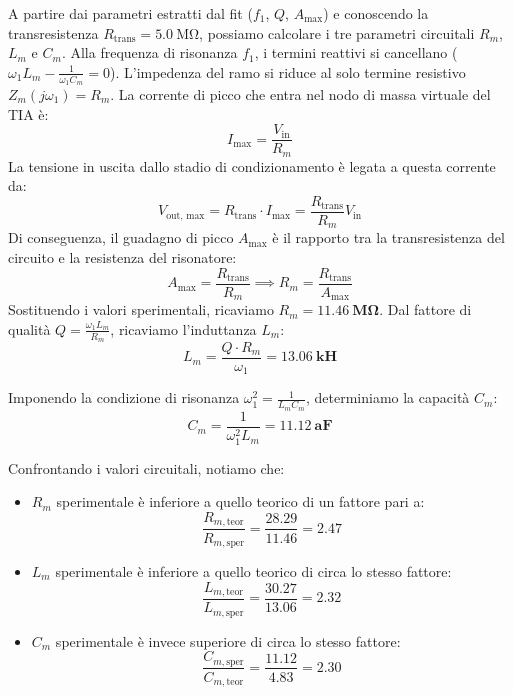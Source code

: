 \documentclass[11pt,a4paper]{article}
\begin{document}
\noindent A partire dai parametri estratti dal fit ($f_1$, $Q$, $A_{\text{max}}$) e conoscendo la transresistenza $R_{\text{trans}} = \SI{5.0}{\mega\ohm}$, possiamo calcolare i tre parametri circuitali $R_m$, $L_m$ e $C_m$. Alla frequenza di risonanza $f_1$, i termini reattivi si cancellano ($\omega_1 L_m - \frac{1}{\omega_1 C_m} = 0$). L'impedenza del ramo si riduce al solo termine resistivo $Z_m(j\omega_1) = R_m$. La corrente di picco che entra nel nodo di massa virtuale del TIA è:
\begin{equation}
    I_{\text{max}} = \frac{V_{\text{in}}}{R_m}
\end{equation}
La tensione in uscita dallo stadio di condizionamento è legata a questa corrente da:
\begin{equation}
    V_{\text{out, max}} = R_{\text{trans}} \cdot I_{\text{max}} = \frac{R_{\text{trans}}}{R_m} V_{\text{in}}
\end{equation}
Di conseguenza, il guadagno di picco $A_{\text{max}}$ è il rapporto tra la transresistenza del circuito e la resistenza del risonatore:
\begin{equation}
    A_{\text{max}} = \frac{R_{\text{trans}}}{R_m} \implies R_m = \frac{R_{\text{trans}}}{A_{\text{max}}}
\end{equation}
Sostituendo i valori sperimentali, ricaviamo $R_m  = \mathbf{\SI{11.46}{\mega\ohm}}$. Dal fattore di qualità $Q = \frac{\omega_1 L_m}{R_m}$, ricaviamo l'induttanza $L_m$:
\begin{equation}
    \label{eq:lm_sperimentale}
    L_m = \frac{Q \cdot R_m}{\omega_1}  = \mathbf{\SI{13.06}{\kilo\henry}}
\end{equation}

\noindent Imponendo la condizione di risonanza $\omega_1^2 = \frac{1}{L_m C_m}$, determiniamo la capacità  $C_m$:
\begin{equation}
    \label{eq:cm_sperimentale}
    C_m = \frac{1}{\omega_1^2 L_m} =  \mathbf{\SI{11.12}{\atto\farad}}
\end{equation}


\noindent Confrontando i valori circuitali, notiamo che:
    \begin{itemize}
        \item $R_m$ sperimentale è inferiore a quello teorico di un fattore pari a:
        \begin{equation}
            \frac{R_{m, \text{teor}}}{R_{m, \text{sper}}} = \frac{28.29}{11.46} = 2.47
        \end{equation}
        \item $L_m$ sperimentale è inferiore a quello teorico di circa lo stesso fattore:
        \begin{equation}
            \frac{L_{m, \text{teor}}}{L_{m, \text{sper}}} = \frac{30.27}{13.06} = 2.32
        \end{equation}
        \item $C_m$ sperimentale è invece superiore di circa lo stesso fattore:
        \begin{equation}
            \frac{C_{m, \text{sper}}}{C_{m, \text{teor}}} = \frac{11.12}{4.83} = 2.30
        \end{equation}
    \end{itemize}
\end{document}
